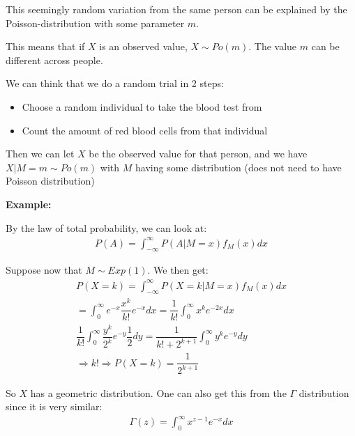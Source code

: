 \noindent This seemingly random variation from the same person can be explained by the Poisson-distribution with some parameter $m$.\par
\noindent This means that if $X$ is an observed value, $X\sim Po(m)$. The value $m$ can be different across people. 
\par\bigskip
\noindent We can think that we do a random trial in 2 steps:\par
\begin{itemize}
  \item Choose a random individual to take the blood test from
  \item Count the amount of red blood cells from that individual
\end{itemize}\par
\noindent Then we can let $X$ be the observed value for that person, and we have $X|M = m\sim Po(m)$ with $M$ having some distribution (does not need to have Poisson distribution)
\par\bigskip
\noindent\textbf{Example:}\par
\noindent By the law of total probability, we can look at:
\begin{equation*}
  \begin{gathered}
    P(A) = \int_{-\infty}^{\infty}P(A|M=x)f_M(x)dx
  \end{gathered}
\end{equation*}\par
\noindent Suppose now that $M\sim Exp(1)$. We then get:
\begin{equation*}
  \begin{gathered}
    P(X=k)= \int_{-\infty}^{\infty}P(X=k|M=x)f_M(x)dx\\
    =\int_{0}^{\infty}e^{-x}\dfrac{x^k}{k!}e^{-x}dx=\dfrac{1}{k!}\int_{0}^{\infty}x^ke^{-2x}dx\\
    \dfrac{1}{k!}\int_{0}^{\infty}\dfrac{y^k}{2^k}e^{-y}\dfrac{1}{2}dy=\dfrac{1}{k!+2^{k+1}}\int_{0}^{\infty}y^ke^{-y}dy\\
    \Rightarrow k!\Rightarrow P(X=k) = \dfrac{1}{2^{k+1}}
  \end{gathered}
\end{equation*}\par
\noindent So $X$ has a geometric distribution. One can also get this from the $\Gamma$ distribution since it is very similar:
\begin{equation*}
  \begin{gathered}
    \Gamma(z) = \int_{0}^{\infty}x^{z-1}e^{-x}dx 
  \end{gathered}
\end{equation*}\par
